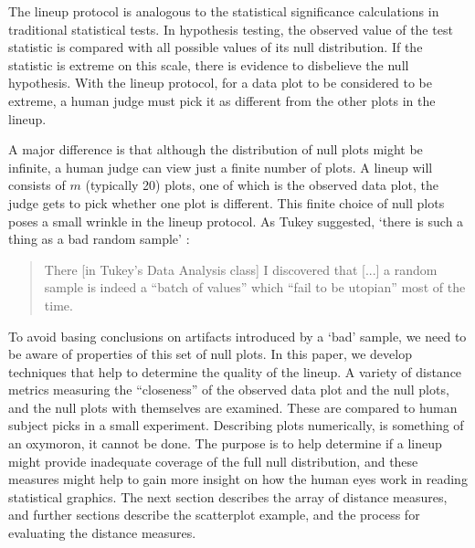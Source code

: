 The lineup protocol is analogous to the statistical significance calculations in traditional statistical tests. In hypothesis testing, the observed value of the test statistic is compared with all possible values of its null distribution. If the statistic is extreme on this scale, there is evidence to disbelieve the null hypothesis. With the lineup protocol, for a data plot to be considered to be extreme, a human judge must pick it as different from the other plots in the lineup. 

A major difference is that although the distribution of null plots might be infinite, a human judge can view just a finite number of plots. A lineup will consists of $m$ (typically 20) plots, one of which is the observed data plot, the judge gets to pick whether one plot is different. This finite choice of null plots poses a small wrinkle in the lineup protocol. As Tukey suggested, `there is such a thing as a bad random sample' \citep{fernholz03}:

\begin{quotation}
There [in Tukey's Data Analysis class] I discovered that [...]  a random sample is indeed a ``batch of values'' which ``fail to be utopian'' most of the time.
\end{quotation}

To avoid basing conclusions on artifacts introduced by a `bad' sample, we need to be aware of properties of this set of null plots. In this paper, we develop techniques that help to determine the quality of the lineup. A variety of distance metrics measuring the ``closeness'' of the observed data plot and the null plots, and the null plots with themselves are examined. These are compared to human subject picks in a small experiment.  Describing plots numerically, is something  of an oxymoron, it cannot be done. The purpose is to help determine if a lineup might provide inadequate coverage of the full null distribution, and these measures might help to gain more insight on how the human eyes work in reading statistical graphics. The next section describes the array of distance measures, and further sections describe the scatterplot example, and the process for evaluating the distance measures. 


